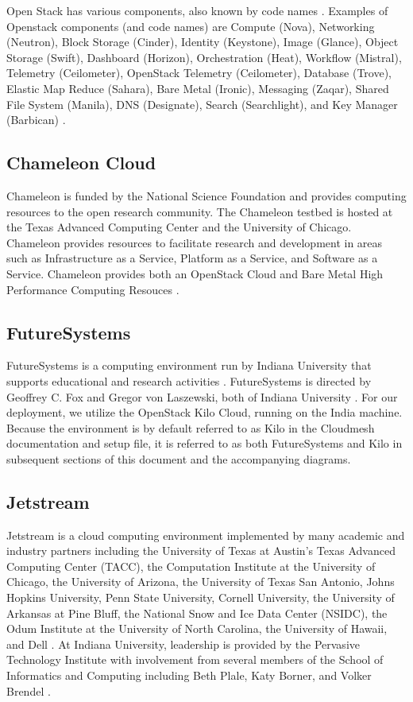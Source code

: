 \documentclass[9pt,twocolumn,twoside]{../../styles/osajnl}
\begin{document}
Open Stack has various components, also known by code names \cite{www-wikiOpenStack}.  Examples of Openstack components (and code names) are Compute (Nova), Networking (Neutron), Block Storage (Cinder), Identity (Keystone), Image (Glance), Object Storage (Swift), Dashboard (Horizon), Orchestration (Heat), Workflow (Mistral), Telemetry (Ceilometer), OpenStack Telemetry (Ceilometer), Database (Trove), Elastic Map Reduce (Sahara), Bare Metal (Ironic), Messaging (Zaqar), Shared File System (Manila), DNS (Designate), Search (Searchlight), and Key Manager (Barbican) \cite{www-wikiOpenStack}.

\subsection{Chameleon Cloud}

Chameleon is funded by the National Science Foundation and provides computing resources to the open research community.  The Chameleon testbed is hosted at the Texas Advanced Computing Center and the University of Chicago. Chameleon provides resources to facilitate research and development in areas such as Infrastructure as a Service, Platform as a Service, and Software as a Service.  Chameleon provides both an OpenStack Cloud and Bare Metal High Performance Computing Resouces \cite{www-chamAbout}.


\subsection{FutureSystems}

FutureSystems is a computing environment run by Indiana University that supports educational and research activities \cite{www-futureSystems}. FutureSystems is directed by Geoffrey C. Fox and Gregor von Laszewski, both of Indiana University \cite{www-futureSystems}.  For our deployment, we utilize the OpenStack Kilo Cloud, running on the India machine.  Because the environment is by default referred to as Kilo in the Cloudmesh documentation and setup file, it is referred to as both FutureSystems and Kilo in subsequent sections of this document and the accompanying diagrams.


\subsection{Jetstream}

Jetstream is a cloud computing environment implemented by many academic and industry partners including the University of Texas at Austin's Texas Advanced Computing Center (TACC), the Computation Institute at the University of Chicago, the University of Arizona, the University of Texas San Antonio, Johns Hopkins University, Penn State University, Cornell University, the University of Arkansas at Pine Bluff, the National Snow and Ice Data Center (NSIDC), the Odum Institute at the University of North Carolina, the University of Hawaii, and Dell \cite{www-jetstream1}.  At Indiana University, leadership is provided by the Pervasive Technology Institute with involvement from several members of the  School of Informatics and Computing including Beth Plale, Katy Borner, and Volker Brendel \cite{www-jetstream2}.
\end{document}
